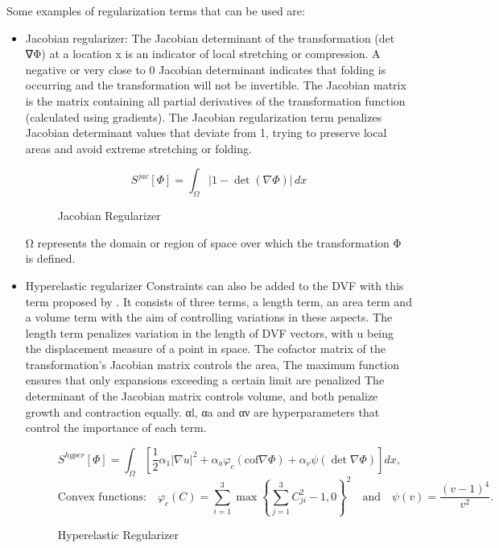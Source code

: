 Some examples of regularization terms that can be used are:
\begin{itemize}
    \item Jacobian regularizer:
    The Jacobian determinant of the transformation (det ∇Φ) at a location x is an indicator of local stretching or compression.
    A negative or very close to 0 Jacobian determinant indicates that folding is occurring and the transformation will not be invertible.
    The Jacobian matrix is the matrix containing all partial derivatives of the transformation function (calculated using gradients).
    The Jacobian regularization term penalizes Jacobian determinant values that deviate from 1,
    trying to preserve local areas and avoid extreme stretching or folding.

    \begin{figure}[tbp]
        \centering
        \[
        S^{jac}[\Phi] = \int_{\Omega} \left| 1 - \det \left( \nabla \Phi \right) \right| \, dx
        \]
        \caption{Jacobian Regularizer}
    \end{figure}

    Ω represents the domain or region of space over which the transformation Φ is defined.
    
    \item Hyperelastic regularizer
    Constraints can also be added to the DVF with this term proposed by \cite{HyperelasticRegularization}.
    It consists of three terms, a length term, an area term and a volume term with the aim of controlling variations in these aspects.
    The length term penalizes variation in the length of DVF vectors, with u being the displacement measure of a point in space.
    The cofactor matrix of the transformation's Jacobian matrix controls the area,
    The maximum function ensures that only expansions exceeding a certain limit are penalized
    The determinant of the Jacobian matrix controls volume,
    and both penalize growth and contraction equally.
    αl, αa and αν are hyperparameters that control the importance of each term.

    \begin{figure}[tbp]
        \centering
        \[
        S^{hyper}[\Phi] = \int_{\Omega} \left[ \frac{1}{2} \alpha_1 |\nabla u|^2 + \alpha_a \varphi_c (\text{cof} \nabla \Phi) + \alpha_\nu \psi(\det \nabla \Phi) \right] dx,
        \]
        \[
        \text{Convex functions:} \quad \varphi_c(C) = \sum_{i=1}^3 \max \left\{ \sum_{j=1}^3 C_{ji}^2 - 1, 0 \right\}^2 \quad \text{and} \quad \psi(v) = \frac{(v-1)^4}{v^2}.
        \]
        \caption{Hyperelastic Regularizer}
    \end{figure}



\end{itemize}
